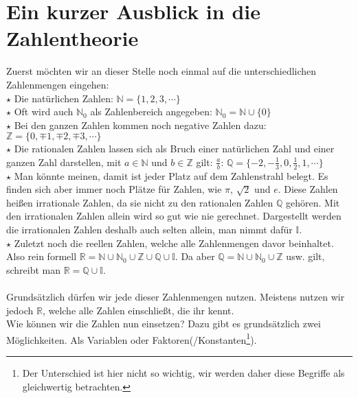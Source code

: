 \section{Ein kurzer Ausblick in die Zahlentheorie}
	Zuerst möchten wir an dieser Stelle noch einmal auf die unterschiedlichen
	Zahlenmengen eingehen:\\
	
	\(\star\) Die natürlichen Zahlen: \(\mathbb{N}=\{1,2,3,\cdots\}\) \\
	
	\(\star\) Oft wird auch \(\mathbb{N}_0\) als Zahlenbereich angegeben:
	\(\mathbb{N}_0=\mathbb{N}\cup\{0\}\)\\
	
	\(\star\) Bei den ganzen Zahlen kommen noch negative Zahlen dazu:
	\(\mathbb{Z}=\{0,\mp 1,\mp 2,\mp 3,\cdots\}\) \\
	
	\(\star\) Die rationalen Zahlen lassen sich als Bruch einer natürlichen Zahl
	und einer ganzen Zahl darstellen, mit \(a\in\mathbb{N}\) und \(b\in\mathbb{Z}\)
	gilt: \(\frac{a}{b}\):
	\(\mathbb{Q}=\{-2,-\frac{1}{3},0,\frac{1}{2},1,\cdots\}\) \\
	
	$\star$ Man könnte meinen, damit ist jeder Platz auf dem Zahlenstrahl belegt.
	Es finden sich aber immer noch Plätze für Zahlen, wie \(\pi\), \(\sqrt{2}\) und
	\(e\).
	Diese Zahlen heißen irrationale Zahlen, da sie nicht zu den rationalen Zahlen
	\(\mathbb{Q}\) gehören. Mit den irrationalen Zahlen allein wird so gut wie nie
	gerechnet. Dargestellt werden die irrationalen Zahlen deshalb auch selten
	allein, man nimmt dafür \(\mathbb{I}\).\\

	\(\star\) Zuletzt noch die reellen Zahlen, welche alle Zahlenmengen davor
	beinhaltet. Also rein formell
	\(\mathbb{R}=\mathbb{N}\cup\mathbb{N}_0\cup\mathbb{Z}\cup\mathbb{Q}\cup\mathbb{I}\).
	Da aber \(\mathbb{Q}=\mathbb{N}\cup\mathbb{N}_0\cup\mathbb{Z}\) usw. gilt,
	schreibt man \(\mathbb{R}=\mathbb{Q}\cup\mathbb{I}\). \\ \\
	
	Grundsätzlich dürfen wir jede dieser Zahlenmengen nutzen. Meistens nutzen wir
	jedoch \(\mathbb{R}\), welche alle Zahlen einschließt, die ihr kennt. \\
	Wie können wir die Zahlen nun einsetzen? Dazu gibt es grundsätzlich zwei
	Möglichkeiten. Als Variablen oder Faktoren(/Konstanten\footnote{Der Unterschied
	ist hier nicht so wichtig, wir werden daher diese Begriffe als gleichwertig
	betrachten.}).\\
	
